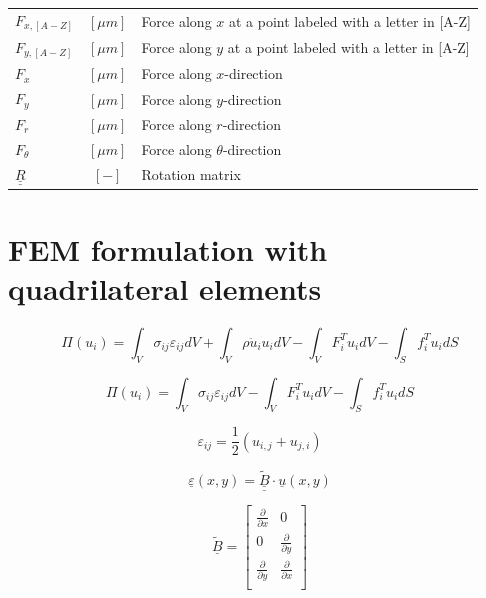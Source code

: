 \documentclass[a4paper]{jpconf}
\begin{document}
\begin{tabular}{lcl}
$F_{x,[A-Z]}$ & $\left[\mu m\right]$  & Force along $x$ at a point labeled with a letter in [A-Z]\\
$F_{y,[A-Z]}$ & $\left[\mu m\right]$  & Force along $y$ at a point labeled with a letter in [A-Z]\\
$F_{x}$ & $\left[\mu m\right]$  & Force along $x$-direction\\
$F_{y}$ & $\left[\mu m\right]$  & Force along $y$-direction\\
$F_{r}$ & $\left[\mu m\right]$  & Force along $r$-direction\\
$F_{\theta}$ & $\left[\mu m\right]$  & Force along $\theta$-direction\\
$\underline{\underline{R}}$ & $\left[-\right]$  & Rotation matrix\\
\end{tabular}

\clearpage
\section{ FEM formulation with quadrilateral elements}

\begin{equation}
\Pi\left(u_{i}\right)=\int_{V}\sigma_{ij}\varepsilon_{ij}dV+\int_{V}\rho\ddot{u}_{i}u_{i}dV-\int_{V}F^{T}_{i}u_{i}dV-\int_{S}f^{T}_{i}u_{i}dS
\end{equation}

\begin{equation}
\Pi\left(u_{i}\right)=\int_{V}\sigma_{ij}\varepsilon_{ij}dV-\int_{V}F^{T}_{i}u_{i}dV-\int_{S}f^{T}_{i}u_{i}dS
\end{equation}

\begin{equation}
\varepsilon_{ij}=\frac{1}{2}\left(u_{i,j}+u_{j,i}\right)
\end{equation}

\begin{equation}
\underline{\varepsilon}\left(x,y\right)=\underline{\underline{\widetilde{B}}}\cdot\underline{u}\left(x,y\right)
\end{equation}

\begin{equation}
\underline{\widetilde{B}}=\begin{bmatrix}
\frac{\partial }{\partial x}&0\\[7.5pt]
0&\frac{\partial }{\partial y}\\[7.5pt]
\frac{\partial }{\partial y}&\frac{\partial }{\partial x}\\
\end{bmatrix}
\end{equation}
\end{document}
